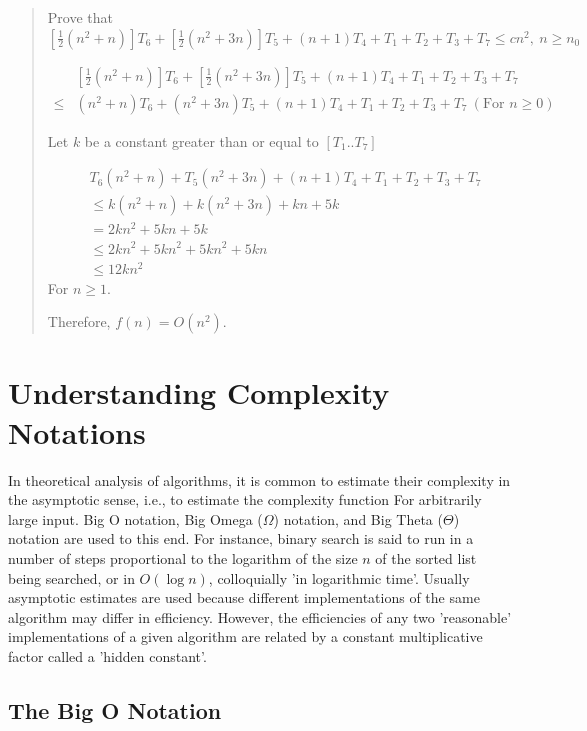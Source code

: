 \documentclass[12pt]{book} %
\begin{document}
\begin{quote}
Prove that $\left[ \frac{1}{2} (n^2 + n) \right] T_6 + \left[ \frac{1}{2} (n^2 + 3n) \right] T_5 + (n + 1)T_4 + T_1 + T_2 + T_3 + T_7 \le cn^2,\ n \ge n_0$

\begin{align}
&\left[ \frac{1}{2} (n^2 + n) \right] T_6 + \left[ \frac{1}{2} (n^2 + 3n) \right] T_5 + (n + 1)T_4 + T_1 + T_2 + T_3 + T_7\\
\le &( n^2 + n )T_6 + ( n^2 + 3n )T_5 + (n + 1)T_4 + T_1 + T_2 + T_3 + T_7 \ (\text{For } n \ge 0 )
\end{align}


Let $k$ be a constant greater than or equal to $[T_1..T_7]$

\begin{align}
&T_6( n^2 + n ) + T_5( n^2 + 3n ) + (n + 1)T_4 + T_1 + T_2 + T_3 + T_7 \nonumber\\
&\le k( n^2 + n ) + k( n^2 + 3n ) + kn + 5k \nonumber\\
&= 2kn^2 + 5kn + 5k \nonumber\\
&\le 2kn^2 + 5kn^2 + 5kn^2 + 5kn \nonumber\\
&\le 12kn^2
\end{align}
For $n \ge 1$.

Therefore, $f(n) = O(n^2)$.
\end{quote}

\section{Understanding Complexity Notations}
In theoretical analysis of algorithms, it is common to estimate their complexity in the asymptotic sense, i.e., to estimate the complexity function For arbitrarily large input. Big O notation, Big Omega (\(\Omega\)) notation, and Big Theta (\(\Theta\)) notation are used to this end. For instance, binary search is said to run in a number of steps proportional to the logarithm of the size $n$ of the sorted list being searched, or in $O(\log n)$, colloquially 'in logarithmic time'. Usually asymptotic estimates are used because different implementations of the same algorithm may differ in efficiency. However, the efficiencies of any two 'reasonable' implementations of a given algorithm are related by a constant multiplicative factor called a 'hidden constant'.

\subsection{The Big O Notation}
\end{document}
